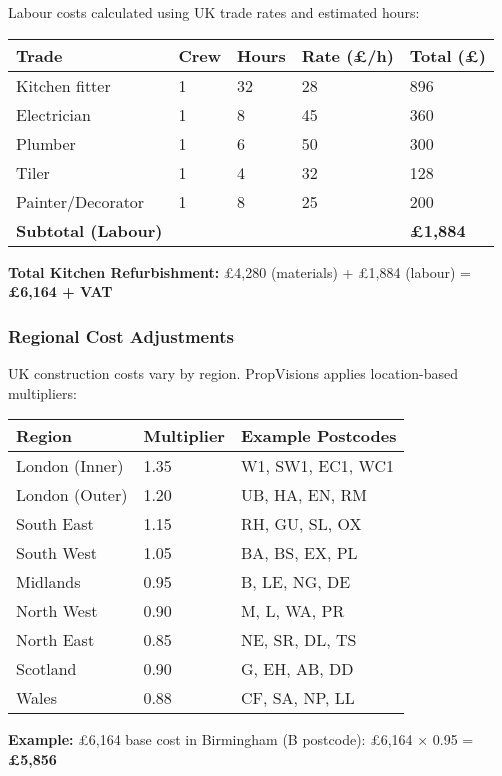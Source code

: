 \documentclass[11pt,a4paper]{article}
\begin{document}
Labour costs calculated using UK trade rates and estimated hours:

\begin{longtable}{@{}p{5cm}p{2cm}p{2cm}p{2.5cm}p{2.5cm}@{}}
\toprule
\textbf{Trade} & \textbf{Crew} & \textbf{Hours} & \textbf{Rate (£/h)} & \textbf{Total (£)} \\
\midrule
Kitchen fitter & 1 & 32 & 28 & 896 \\
Electrician & 1 & 8 & 45 & 360 \\
Plumber & 1 & 6 & 50 & 300 \\
Tiler & 1 & 4 & 32 & 128 \\
Painter/Decorator & 1 & 8 & 25 & 200 \\
\midrule
\textbf{Subtotal (Labour)} & & & & \textbf{£1,884} \\
\bottomrule
\end{longtable}

\textbf{Total Kitchen Refurbishment:} £4,280 (materials) + £1,884 (labour) = \textbf{£6,164 + VAT}

\subsubsection{Regional Cost Adjustments}

UK construction costs vary by region. PropVisions applies location-based multipliers:

\begin{longtable}{@{}p{5cm}p{3cm}p{6cm}@{}}
\toprule
\textbf{Region} & \textbf{Multiplier} & \textbf{Example Postcodes} \\
\midrule
London (Inner) & 1.35 & W1, SW1, EC1, WC1 \\
London (Outer) & 1.20 & UB, HA, EN, RM \\
South East & 1.15 & RH, GU, SL, OX \\
South West & 1.05 & BA, BS, EX, PL \\
Midlands & 0.95 & B, LE, NG, DE \\
North West & 0.90 & M, L, WA, PR \\
North East & 0.85 & NE, SR, DL, TS \\
Scotland & 0.90 & G, EH, AB, DD \\
Wales & 0.88 & CF, SA, NP, LL \\
\bottomrule
\end{longtable}

\textbf{Example:} £6,164 base cost in Birmingham (B postcode): £6,164 × 0.95 = \textbf{£5,856}
\end{document}
